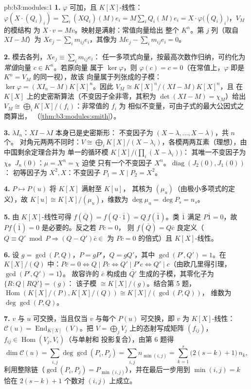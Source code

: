 \begin{solution}{pb:b3:modules:1}
\textbf{1.} $\varphi$ 可加，且 $K[X]$-线性：$\varphi(X
\cdot (Q_i)_i) = \sum_i (XQ_i)(M)e_i = M\sum_i Q_i(M)e_i = X
\cdot \varphi\bigl((Q_i)_i\bigr)$，$V_M$ 的模结构
为 $X \cdot v = Mv$。映射是满射：常值向量给出
整个 $K^n$。第 $j$ 列（取自 $XI - M$）为 $Xe_j - \sum_i
m_{ij}e_i$，其像为 $Me_j - \sum_i m_{ij}e_i = 0$。

\textbf{2.} 模去各列，$Xe_j \equiv \sum_i m_{ij}e_i$：
任一多项式向量，按最高次数作归纳，可约化为
\emph{常值}向量 $c \in K^n$。若原向量
属于 $\ker\varphi$，则 $\varphi(c) = c = 0$（在常值上，$\varphi$ 即是
$K^n = V_M$ 的同一视），故该
向量属于列张成的子模：$\ker\varphi = (XI_n -
M)K[X]^n$。因此 $V_M \cong K[X]^n/(XI - M)K[X]^n$，且
在 $K[X]$ 上的史密斯算法（不变因子全非零，其积为
$\det(XI - M) = \chi_M$）给出 $V_M \cong \bigoplus_i
K[X]/(f_i)$：非常值的 $f_i$ 为
相似不变量，可由子式的最大公因式之商算出，
（\cref{thm:b3:modules:smith}）。

\textbf{3.} $\lambda I_n$：$XI - \lambda I$ 本身已是史密斯形：
不变因子为 $(X - \lambda, \dots, X - \lambda)$，共 $n$ 个。
对角元两两不同时：$V \cong \bigoplus_i K[X]/(X -
\lambda_i)$，各模两两互素（理想），由中国剩余定理合并为
单一的循环模 $K[X]/\bigl(\prod_i(X - \lambda_i)\bigr)$：
其唯一不变因子为 $\chi$。$J_n(0)$：$\mu = X^n = \chi$ 迫使
只有一个不变因子 $X^n$。$\operatorname{diag}(J_2(0), J_1(0))$：
初等因子为 $X^2, X$：不变因子 $P_1 = X \mid P_2 =
X^2$。

\textbf{4.} $P \mapsto P(u)$ 将 $K[X]$ 满射至 $K[u]$，
其核为 $(\mu_u)$（由极小多项式的定义），故 $K[u]
\cong K[X]/(\mu_u)$，维数为 $\deg\mu_u = \deg P_s = n_s$。

\textbf{5.} 由 $K[X]$-线性可得 $f(\bar Q) = f(Q\cdot\bar 1)
= Q\,f(\bar 1)$。类 $\bar 1$ 满足 $P \bar 1 = 0$，故
$P f(\bar 1) = 0$ 是必要的。反之若 $P\bar c = 0$，
则 $f(\bar Q) = Q\bar c$ 良定义（$Q \equiv Q' \bmod P
\Rightarrow (Q - Q')\bar c \in$ 为 $P\bar c = 0$ 的倍式）且
$K[X]$-线性。

\textbf{6.} 设 $g = \gcd(P, Q)$，$P = gP'$，$Q = gQ'$，其中
$\gcd(P', Q') = 1$。在 $K[X]/(Q)$ 中：$P\bar c = 0 \iff Q \mid Pc
\iff Q' \mid P'c \iff Q' \mid c$（由欧几里得引理，$\gcd(P', Q') = 1$）。
故容许的 $\bar c$ 构成由
$\bar{Q'}$ 生成的子模，其零化子为 $\{R : Q \mid RQ'\} = (g)$：
该子模 $\cong K[X]/(g)$。结合第 5 题，
$\operatorname{Hom}(K[X]/(P), K[X]/(Q)) \cong K[X]/(\gcd(P,Q))$，
维数为 $\deg\gcd(P,Q)$。

\textbf{7.} $v$ 与 $u$ 可交换，当且仅当 $v$ 与每个
$P(u)$ 可交换，即 $v$ 为 $K[X]$-线性：$\mathcal C(u) =
\operatorname{End}_{K[X]}(V)$。把 $V =
\bigoplus_j V_j$ 上的态射写成矩阵 $(f_{ij})$，$f_{ij} \in
\operatorname{Hom}(V_j, V_i)$（与单射和
投影复合），由第 6 题得
\[
\dim \mathcal C(u) = \sum_{i,j} \deg\gcd(P_i, P_j)
= \sum_{i,j} n_{\min(i,j)}
= \sum_{k=1}^{s} \bigl(2(s - k) + 1\bigr)\,n_k ,
\]
利用整除链（$\gcd(P_i, P_j) =
P_{\min(i,j)}$），并在最后一步用到 $\min(i,j) = k$
恰在 $2(s - k) + 1$ 个数对 $(i, j)$ 上成立。


\end{solution}
